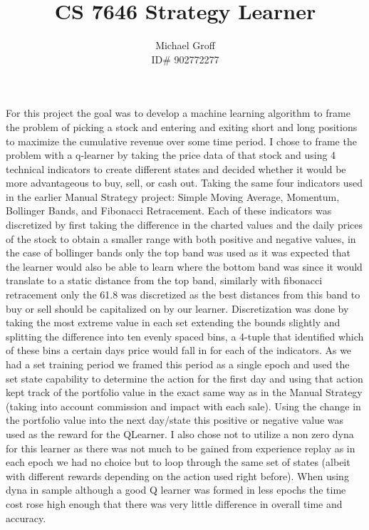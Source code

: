 \documentclass[12pt]{article}
\begin{document}
\title{CS 7646 Strategy Learner}
\author{Michael Groff \\ ID\# 902772277}
\maketitle
For this project the goal was to develop a machine learning algorithm to frame the problem of picking a stock and entering and exiting short and long positions to maximize the cumulative revenue over some time period. I chose to frame the problem with a q-learner by taking the price data of that stock and using 4 technical indicators to create different states and decided whether it would be more advantageous to buy, sell, or cash out. Taking the same four indicators used in the earlier Manual Strategy project: Simple Moving Average, Momentum, Bollinger Bands, and Fibonacci Retracement. Each of these indicators was discretized by first taking the difference in the charted values and the daily prices of the stock to obtain a smaller range with both positive and negative values, in the case of bollinger bands only the top band was used as it was expected that the learner would also be able to learn where the bottom band was since it would translate to a static distance from the top band, similarly with fibonacci retracement only the 61.8 was discretized as the best distances from this band to buy or sell should be capitalized on by our learner. Discretization was done by taking the most extreme value in each set extending the bounds slightly and splitting the difference into ten evenly spaced bins, a 4-tuple that identified which of these bins a certain days price would fall in for each of the indicators. As we had a set training period we framed this period as a single epoch and used the set state capability to determine the action for the first day and using that action kept track of the portfolio value in the exact same way as in the Manual Strategy (taking into account commission and impact with each sale). Using the change in the portfolio value into the next day/state this positive or negative value was used as the reward for the QLearner. I also chose not to utilize a non zero dyna for this learner as there was not much to be gained from experience replay as in each epoch we had no choice but to loop through the same set of states (albeit with different rewards depending on the action used right before). When using dyna in sample although a good Q learner was formed in less epochs the time cost rose high enough that there was very little difference in overall time and accuracy. \\
\end{document}
